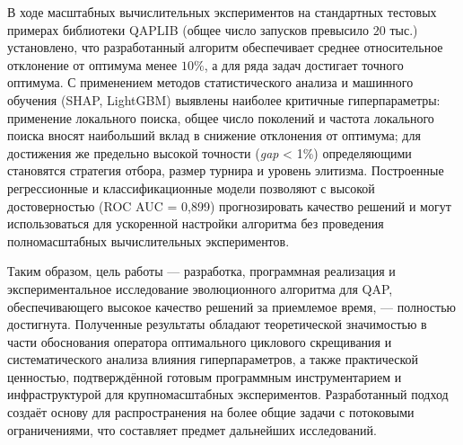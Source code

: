 \documentclass[732]{studrep}
\theoremstyle{nonumberplain}
\begin{document}
В ходе масштабных вычислительных экспериментов на стандартных тестовых примерах библиотеки QAPLIB (общее число запусков превысило $20$ тыс.) установлено, что разработанный алгоритм обеспечивает среднее относительное отклонение от оптимума менее $10\%$, а для ряда задач достигает точного оптимума. С применением методов статистического анализа и машинного обучения (SHAP, LightGBM) выявлены наиболее критичные гиперпараметры: применение локального поиска, общее число поколений и частота локального поиска вносят наибольший вклад в снижение отклонения от оптимума; для достижения же предельно высокой точности (\textit{gap} < 1\%) определяющими становятся стратегия отбора, размер турнира и уровень элитизма. Построенные регрессионные и классификационные модели позволяют с высокой достоверностью (ROC AUC = 0,899) прогнозировать качество решений и могут использоваться для ускоренной настройки алгоритма без проведения полномасштабных вычислительных экспериментов.

Таким образом, цель работы — разработка, программная реализация и экспериментальное исследование эволюционного алгоритма для QAP, обеспечивающего высокое качество решений за приемлемое время, — полностью достигнута. Полученные результаты обладают теоретической значимостью в части обоснования оператора оптимального циклового скрещивания и систематического анализа влияния гиперпараметров, а также практической ценностью, подтверждённой готовым программным инструментарием и инфраструктурой для крупномасштабных экспериментов. Разработанный подход создаёт основу для распространения на более общие задачи с потоковыми ограничениями, что составляет предмет дальнейших исследований.
\end{document}
